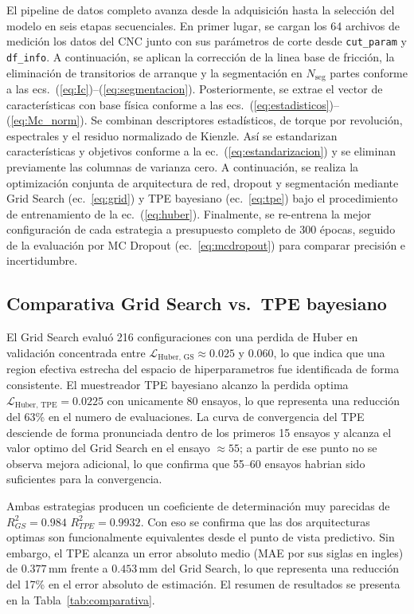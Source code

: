 \documentclass[12pt, letterpaper]{article}
\begin{document}
El pipeline de datos completo avanza desde la adquisición hasta la selección del modelo en seis etapas secuenciales. En primer lugar, se cargan los 64 archivos de medición los datos del CNC junto con sus parámetros de corte desde \texttt{cut\_param} y \texttt{df\_info}. A continuación, se aplican la corrección de la linea base de fricción, la eliminación de transitorios de arranque y la segmentación en $N_{\text{seg}}$ partes conforme a las ecs.~(\ref{eq:Ic})--(\ref{eq:segmentacion}). Posteriormente, se extrae el vector de características con base física conforme a las ecs.~(\ref{eq:estadisticos})--(\ref{eq:Mc_norm}). Se combinan descriptores estadísticos, de torque por revolución, espectrales y el residuo normalizado de Kienzle. Así se estandarizan características y objetivos conforme a la ec.~(\ref{eq:estandarizacion}) y se eliminan previamente las columnas de varianza cero. A continuación, se realiza la optimización conjunta de arquitectura de red, dropout y segmentación mediante Grid Search (ec.~\ref{eq:grid}) y TPE bayesiano (ec.~\ref{eq:tpe}) bajo el procedimiento de entrenamiento de la ec.~(\ref{eq:huber}). Finalmente, se re-entrena la mejor configuración de cada estrategia a presupuesto completo de 300 épocas, seguido de la evaluación por MC Dropout (ec.~\ref{eq:mcdropout}) para comparar precisión e incertidumbre.

\subsection{Comparativa Grid Search vs.\ TPE bayesiano}

El Grid Search evaluó 216 configuraciones con una perdida de Huber en validación concentrada entre $\mathcal{L}_{\text{Huber, GS}} \approx 0.025$ y $0.060$, lo que indica que una region efectiva estrecha del espacio de hiperparametros fue identificada de forma consistente. El muestreador TPE bayesiano alcanzo la perdida optima $\mathcal{L}_{\text{Huber, TPE}} = 0.0225$ con unicamente 80 ensayos, lo que representa una reducción del 63\% en el numero de evaluaciones. La curva de convergencia del TPE desciende de forma pronunciada dentro de los primeros 15 ensayos y alcanza el valor optimo del Grid Search en el ensayo $\approx 55$; a partir de ese punto no se observa mejora adicional, lo que confirma que 55--60 ensayos habrian sido suficientes para la convergencia.

Ambas estrategias producen un coeficiente de determinación muy parecidas de $R^2_{GS} = 0.984$ $R^2_{TPE} = 0.9932$. Con eso se confirma que las dos arquitecturas optimas son funcionalmente equivalentes desde el punto de vista predictivo. Sin embargo, el TPE alcanza un error absoluto medio (MAE por sus siglas en ingles) de $0.377\,\text{mm}$ frente a $0.453\,\text{mm}$ del Grid Search, lo que representa una reducción del 17\% en el error absoluto de estimación. El resumen de resultados se presenta en la Tabla~\ref{tab:comparativa}.
\end{document}
